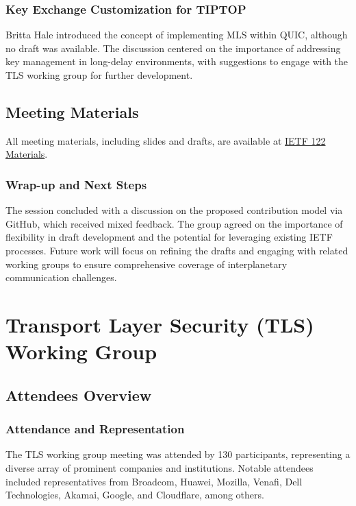 \documentclass{article}
\begin{document}
\subsubsection{Key Exchange Customization for TIPTOP}
Britta Hale introduced the concept of implementing MLS within QUIC, although no draft was available. The discussion centered on the importance of addressing key management in long-delay environments, with suggestions to engage with the TLS working group for further development.

\subsection{Meeting Materials}
All meeting materials, including slides and drafts, are available at \href{https://datatracker.ietf.org/meeting/122/materials.html}{IETF 122 Materials}.

\subsubsection{Wrap-up and Next Steps}
The session concluded with a discussion on the proposed contribution model via GitHub, which received mixed feedback. The group agreed on the importance of flexibility in draft development and the potential for leveraging existing IETF processes. Future work will focus on refining the drafts and engaging with related working groups to ensure comprehensive coverage of interplanetary communication challenges.



\newpage

\section{Transport Layer Security (TLS) Working Group}

\subsection{Attendees Overview}
\subsubsection{Attendance and Representation}
The TLS working group meeting was attended by 130 participants, representing a diverse array of prominent companies and institutions. Notable attendees included representatives from Broadcom, Huawei, Mozilla, Venafi, Dell Technologies, Akamai, Google, and Cloudflare, among others.
\end{document}
